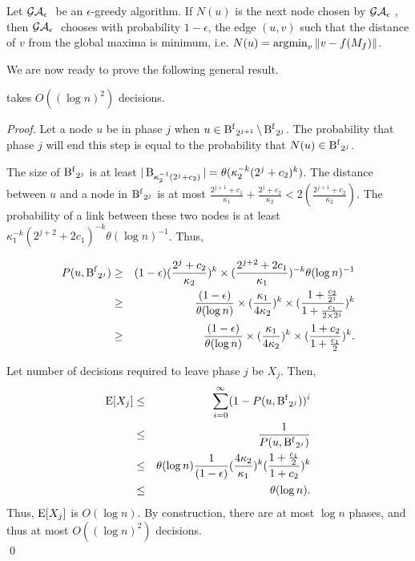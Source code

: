 \begin{definition}
    Let $\mathcal{GA}_{\epsilon}~$ be an $\epsilon$-greedy algorithm. If $N(u)$ is
    the next node chosen by $\mathcal{GA}_{\epsilon}~$, then $\mathcal{GA}_{\epsilon}~$
    chooses with probability $1-\epsilon$, the edge $(u,v)$ such that
    the distance of $v$ from the global maxima is minimum, i.e. $N(u)
    = \operatorname{argmin}_v \|v - f(M_f)\|$.
\end{definition}

We are now ready to prove the following general result.

\begin{theorem}
    \label{thm:decisions}
    \egreedyalgo takes $O( (\log n)^2 )$ decisions.
\end{theorem}
\begin{proof}
    Let a node $u$ be in phase $j$ when $u \in \operatorname{B^{f}}_{2^{j+1}}
    \setminus \operatorname{B^{f}}_{2^{j}}$. The probability that phase $j$
    will end this step is equal to the probability that $N(u) \in
    \operatorname{B^{f}}_{2^{j}}$. 
    
    The size of $\operatorname{B^{f}}_{2^{j}}$ is at least $|\operatorname{B}_{\kappa_2^{-1}(
    2^{j}+c_2)}| = \theta( \kappa_2^{-k} (2^{j}+c_2)^{k} )$. The
    distance between $u$ and a node in $\operatorname{B^{f}}_{2^{j}}$ is at most
    $\frac{2^{j+1} + c_1}{ \kappa_1 } + \frac{2^{j} + c_2}{\kappa_2} <
    2(\frac{2^{j+1} + c_2}{\kappa_2})$. The probability of a link
    between these two nodes is at least $\kappa_1^{-k} (2^{j+2} + 2
    c_1)^{-k} \theta(\log n)^{-1} $. Thus, 

    \begin{eqnarray*}
        P(u, \operatorname{B^{f}}_{2^{j}} ) &\ge& (1-\epsilon) (\frac{2^{j}+c_2}{\kappa_2})^{k} \times (\frac{2^{j+2} + 2 c_1}{\kappa_1})^{-k} \theta( \log n )^{-1}  \\
        &\ge& \frac{(1-\epsilon)}{\theta( \log n )} \times (\frac{\kappa_1}{4\kappa_2} )^{k} \times ( \frac{ 1 + \frac{c_2}{2^{j}} }{ 1 + \frac{c_1}{2 \times 2^{j}} })^{k}\\
        &\ge& \frac{(1-\epsilon)}{\theta( \log n )} \times (\frac{\kappa_1}{4\kappa_2} )^{k} \times ( \frac{ 1 + c_2 }{ 1 + \frac{c_1}{2} })^{k} .\\
    \end{eqnarray*}

    Let number of decisions required to leave phase $j$ be $X_j$. Then, 
    \begin{eqnarray*}
        \operatorname{E}[X_j] &\le& \sum_{i=0}^{\infty} (1 - P(u, \operatorname{B^{f}}_{2^{j}} ))^i \\
                &\le& \frac{1}{P(u, \operatorname{B^{f}}_{2^{j}} )} \\
                &\le& \theta( \log n ) \frac{1}{(1-\epsilon)} (\frac{4 \kappa_2}{\kappa_1})^{k} ( \frac{ 1 + \frac{c_1}{2} }{ 1 + c_2 })^{k}\\
                &\le& \theta( \log n ).
    \end{eqnarray*}
    Thus, $\operatorname{E}[X_j]$ is $O(\log n)$. By construction, there are at most $\log n$
    phases, and thus at most $O((\log n)^2)$ decisions.
    \\ \qed
\end{proof}

